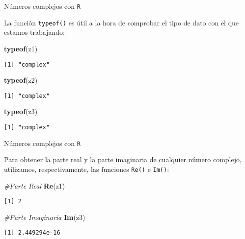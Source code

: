 \documentclass[
  ignorenonframetext,
]{beamer}
\newenvironment{Shaded}{\begin{snugshade}}{\end{snugshade}}
\newcommand{\CommentTok}[1]{\textcolor[rgb]{0.56,0.35,0.01}{\textit{#1}}}
\newcommand{\KeywordTok}[1]{\textcolor[rgb]{0.13,0.29,0.53}{\textbf{#1}}}
\newcommand{\NormalTok}[1]{#1}
\begin{document}
\begin{frame}[fragile]{Números complejos con \texttt{R}}
\protect\hypertarget{nuxfameros-complejos-con-r-3}{}

La función \texttt{typeof()} es útil a la hora de comprobar el tipo de
dato con el que estamos trabajando:

\begin{Shaded}
\begin{Highlighting}[]
\KeywordTok{typeof}\NormalTok{(z1)}
\end{Highlighting}
\end{Shaded}

\begin{verbatim}
[1] "complex"
\end{verbatim}

\begin{Shaded}
\begin{Highlighting}[]
\KeywordTok{typeof}\NormalTok{(z2)}
\end{Highlighting}
\end{Shaded}

\begin{verbatim}
[1] "complex"
\end{verbatim}

\begin{Shaded}
\begin{Highlighting}[]
\KeywordTok{typeof}\NormalTok{(z3)}
\end{Highlighting}
\end{Shaded}

\begin{verbatim}
[1] "complex"
\end{verbatim}

\end{frame}

\begin{frame}[fragile]{Números complejos con \texttt{R}}
\protect\hypertarget{nuxfameros-complejos-con-r-4}{}

Para obtener la parte real y la parte imaginaria de cualquier número
complejo, utilizamos, respectivamente, las funciones \texttt{Re()} e
\texttt{Im()}:

\begin{Shaded}
\begin{Highlighting}[]
\CommentTok{#Parte Real}
\KeywordTok{Re}\NormalTok{(z1)}
\end{Highlighting}
\end{Shaded}

\begin{verbatim}
[1] 2
\end{verbatim}

\begin{Shaded}
\begin{Highlighting}[]
\CommentTok{#Parte Imaginaria}
\KeywordTok{Im}\NormalTok{(z3)}
\end{Highlighting}
\end{Shaded}

\begin{verbatim}
[1] 2.449294e-16
\end{verbatim}

\end{frame}
\end{document}
